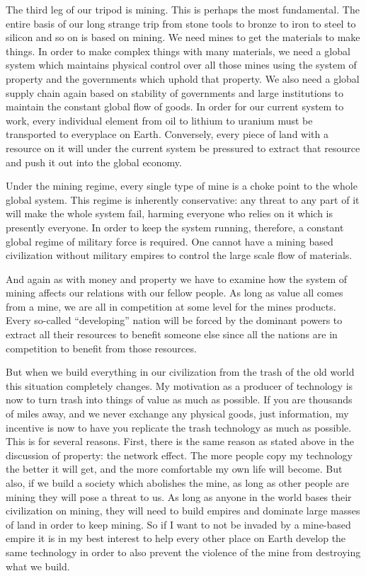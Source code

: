 The third leg of our tripod is mining.  This is perhaps the most fundamental.  The entire basis of our long strange trip from stone tools to bronze to iron to steel to silicon and so on is based on mining.  We need mines to get the materials to make things.   In order to make complex things with many materials, we need a global system which maintains physical control over all those mines using the system of property and the governments which uphold that property.  We also need a global supply chain again based on stability of governments and large institutions to maintain the constant global flow of goods.  In order for our current system to work, every individual element from oil to lithium to uranium must be transported to everyplace on Earth.  Conversely, every piece of land with a resource on it will under the current system be pressured to extract that resource and push it out into the global economy.  

Under the mining regime, every single type of mine is a choke point to the whole global system.  This regime is inherently conservative: any threat to any part of it will make the whole system fail, harming everyone who relies on it which is presently everyone.  In order to keep the system running, therefore, a constant global regime of military force is required.  One cannot have a mining based civilization without military empires to control the large scale flow of materials.  

And again as with money and property we have to examine how the system of mining affects our relations with our fellow people.  As long as value all comes from a mine, we are all in competition at some level for the mines products.  Every so-called ``developing'' nation will be forced by the dominant powers to extract all their resources to benefit someone else since all the nations are in competition to benefit from those resources.  

But when we build everything in our civilization from the trash of the old world this situation completely changes.  My motivation as a producer of technology is now to turn trash into things of value as much as possible.  If you are thousands of miles away, and we never exchange any physical goods, just information, my incentive is now to have you replicate the trash technology as much as possible.  This is for several reasons. First, there is the same reason as stated above in the discussion of property: the network effect.  The more people copy my technology the better it will get, and the more comfortable my own life will become.  But also, if we build a society which abolishes the mine,  as long as other people are mining they will pose a threat to us.  As long as anyone in the world bases their civilization on mining, they will need to build empires and dominate large masses of land in order to keep mining.  So if I want to not be invaded by a mine-based empire it is in my best interest to help every other place on Earth develop the same technology in order to also prevent the violence of the mine from destroying what we build.

